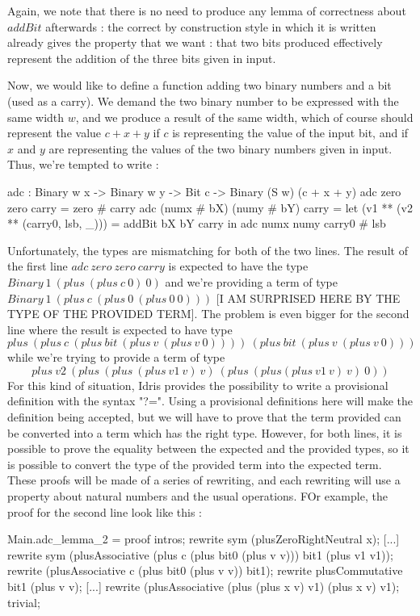Again, we note that there is no need to produce any lemma of correctness about $addBit$ afterwards : the correct by construction style in which it is written already gives the property that we want : that two bits produced effectively represent the addition of the three bits given in input.

Now, we would like to define a function adding two binary numbers and a bit (used as a carry). We demand the two binary number to be expressed with the same width $w$, and we produce a result of the same width, which of course should represent the value $c + x + y$ if $c$ is representing the value of the input bit, and if $x$ and $y$ are representing the values of the two binary numbers given in input. Thus, we're tempted to write :
\begin{code}[caption=Addition of two binary numbers, captionpos=b, label=lst1:haskell2]
adc : Binary w x -> Binary w y -> Bit c 
     -> Binary (S w) (c + x + y)
adc zero zero carry = zero # carry
adc (numx # bX) (numy # bY) carry
   = let (v1 ** (v2 ** (carry0, lsb, _))) = 
      addBit bX bY carry in
          adc numx numy carry0 # lsb
\end{code}
Unfortunately, the types are mismatching for both of the two lines. The result of the first line $adc\ zero\ zero\ carry$ is expected to have the type $Binary\ 1\ (plus\ (plus\ c\ 0)\ 0)$ and we're providing a term of type $Binary\ 1\ (plus\ c\ (plus\ 0\ (plus\ 0\ 0)))$ [I AM SURPRISED HERE BY THE TYPE OF THE PROVIDED TERM].
The problem is even bigger for the second line where the result is expected to have type \[plus\ (plus\ c\ (plus\ bit\ (plus\ v\ (plus\ v\ 0))))\ (plus\ bit\ (plus\ v\ (plus\ v\ 0)))\] while we're trying to provide a term of type \[plus\ v2\ (plus\ (plus\ (plus\ v1\ v)\ v)\ (plus\ (plus (plus\ v1\ v)\ v)\ 0))\]
For this kind of situation, Idris provides the possibility to write a provisional definition with the syntax "?=". Using a provisional definitions here will make the definition being accepted, but we will have to prove that the term provided can be converted into a term which has the right type.
However, for both lines, it is possible to prove the equality between the expected and the provided types, so it is possible to convert the type of the provided term into the expected term. These proofs will be made of a series of rewriting, and each rewriting will use a property about natural numbers and the usual operations.
FOr example, the proof for the second line look like this :
\begin{code}[caption=Proof by hand of correspondence between expected and provided types for the second line of the definition of adc, captionpos=b, label=lst1:haskell2]
Main.adc_lemma_2 = proof {
    intros;
    rewrite sym (plusZeroRightNeutral x);
    [...]
    rewrite sym (plusAssociative (plus c (plus bit0 (plus v v))) bit1 (plus v1 v1));
    rewrite (plusAssociative c (plus bit0 (plus v v)) bit1);
    rewrite plusCommutative bit1 (plus v v);
    [...]
    rewrite (plusAssociative (plus (plus x v) v1) (plus x v) v1);
    trivial;
}
\end{code}

